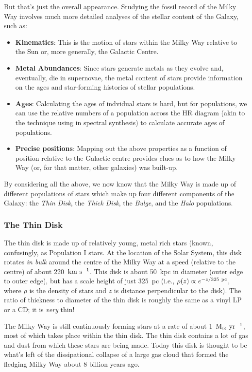 \documentclass[11pt]{article}
\begin{document}
But that's just the overall appearance. Studying the fossil record of
the Milky Way involves much more detailed analyses of the stellar
content of the Galaxy, such as:
\begin{itemize}
\item {\bf Kinematics}: This is the motion of stars within the Milky
  Way relative to the Sun or, more generally, the Galactic Centre.
\item {\bf Metal Abundances}: Since stars generate metals as they
  evolve and, eventually, die in supernovae, the metal content of
  stars provide information on the ages and star-forming histories of
  stellar populations.
\item {\bf Ages}: Calculating the ages of indvidual stars is hard, but
  for populations, we can use the relative numbers of a population
  across the HR diagram (akin to the technique using in spectral
  synthesis) to calculate accurate ages of populations.
\item {\bf Precise positions}: Mapping out the above properties as a
  function of position relative to the Galactic centre provides clues
  as to how the Milky Way (or, for that matter, other galaxies) was
  built-up.
\end{itemize}

By considering all the above, we now know that the Milky Way is made
up of different populations of stars which make up four different
components of the Galaxy: the {\it Thin Disk}, the {\it Thick Disk},
the {\it Bulge}, and the {\it Halo} populations.

\subsubsection{The Thin Disk}
The thin disk is made up of relatively young, metal rich stars (known,
confusingly, as Population {\sc I} stars. At the location of the Solar
System, this disk rotates {\it in bulk} around the centre of the Milky
Way at a speed (relative to the centre) of about
220~${\rm km~s^{-1}}$. This disk is about 50~kpc in diameter (outer
edge to outer edge), but has a scale height of just 325~pc (i.e.,
$\rho(z)\propto e^{-z/325~{\rm pc}}$, where $\rho$ is the density of
stars and $z$ is distance perpendicular to the disk). The ratio of
thickness to diameter of the thin disk is roughly the same as a vinyl
LP or a CD; it is {\it very} thin! 

The Milky Way is still continuously forming stars at a rate of about
1~${\rm M_\odot~yr^{-1}}$, most of which takes place within the thin
disk. The thin disk contains a lot of gas and dust from which these
stars are being made. Today this disk is thought to be what's left of
the dissipational collapse of a large gas cloud that formed the
fledging Milky Way about 8 billion years ago.
\end{document}
